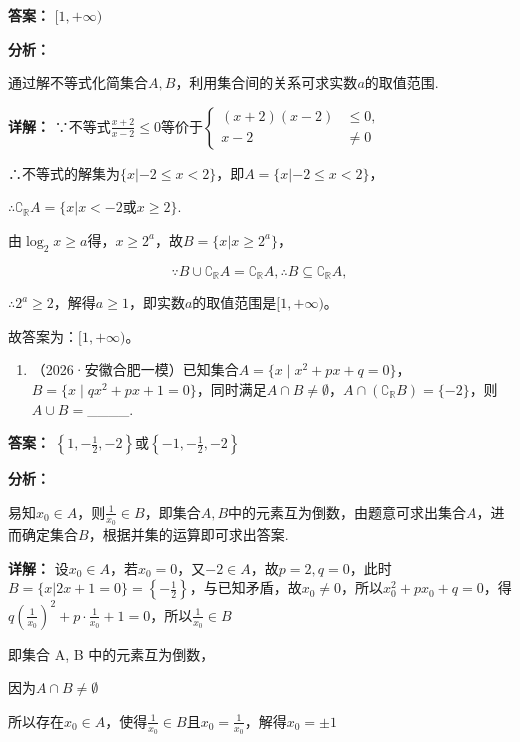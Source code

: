 \documentclass[11pt,a4paper]{ctexart}
\begin{document}
\textbf{答案：}
\([1,+\infty)\)

\textbf{分析：}

通过解不等式化简集合\(A, B\)，利用集合间的关系可求实数\(a\)的取值范围.

\textbf{详解：}
∵不等式\(\frac{x+2}{x-2}\leq0\)等价于\(\left\{\begin{aligned}(x+2)(x-2)&\leq0,\\ x-2&\neq0\end{aligned}\right.\)

∴不等式的解集为\(\{x|-2\leq x<2\}\)，即\(A=\{x|-2\leq x<2\}\)，

\(\therefore \complement_{\mathbb{R}}A = \{x|x < -2 \text{或} x \geq 2\}\).

由\(\log_{2}x\geq a\)得，\(x\geq2^{a}\)，故\(B=\{x|x\geq2^{a}\}\)，

\[
\because B \cup \complement_{\mathbb{R}} A = \complement_{\mathbb{R}} A, \therefore B \subseteq \complement_{\mathbb{R}} A,
\]

\(\therefore 2^{a} \geq 2\)，解得\(a \geq 1\)，即实数\(a\)的取值范围是\([1,+\infty)\)。

故答案为：\([1,+\infty)\)。

\begin{enumerate}[label=\arabic*., leftmargin=*, start=9]
\item （2026·安徽合肥一模）已知集合\(A = \{x \mid x^2 + px + q = 0\}\)，\(B = \{x \mid qx^2 + px + 1 = 0\}\)，同时满足\(A \cap B \neq \emptyset\)，\(A \cap (\complement_{\mathbb{R}}B) = \{-2\}\)，则\(A \cup B =\)\_\_\_\_.
\end{enumerate}

\textbf{答案：}
\(\left\{1,-\frac{1}{2},-2\right\}\)或\(\left\{-1,-\frac{1}{2},-2\right\}\)

\textbf{分析：}

易知\(x_0 \in A\)，则\(\frac{1}{x_0} \in B\)，即集合\(A, B\)中的元素互为倒数，由题意可求出集合\(A\)，进而确定集合\(B\)，根据并集的运算即可求出答案.

\textbf{详解：}
设\(x_0 \in A\)，若\(x_0 = 0\)，又\(-2 \in A\)，故\(p = 2, q = 0\)，此时\(B = \{x | 2x + 1 = 0\} = \left\{-\frac{1}{2}\right\}\)，与已知矛盾，故\(x_0 \neq 0\)，所以\(x_0^2 + px_0 + q = 0\)，得\(q\left(\frac{1}{x_0}\right)^2 + p \cdot \frac{1}{x_0} + 1 = 0\)，所以\(\frac{1}{x_0} \in B\)

即集合 A, B 中的元素互为倒数，

因为\(A \cap B \neq \emptyset\)

所以存在\(x_0 \in A\)，使得\(\frac{1}{x_0} \in B\)且\(x_0 = \frac{1}{x_0}\)，解得\(x_0 = \pm 1\)
\end{document}
